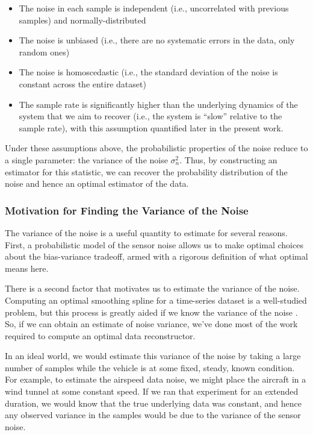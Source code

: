 \begin{itemize}
    \item The noise in each sample is independent (i.e., uncorrelated with previous samples) and normally-distributed
    \item The noise is unbiased (i.e., there are no systematic errors in the data, only random ones)
    \item The noise is homoscedastic (i.e., the standard deviation of the noise is constant across the entire dataset)
    \item The sample rate is significantly higher than the underlying dynamics of the system that we aim to recover (i.e., the system is ``slow'' relative to the sample rate), with this assumption quantified later in the present work.
\end{itemize}

Under these assumptions above, the probabilistic properties of the noise reduce to a single parameter: the variance of the noise $\sigma^2_n$. Thus, by constructing an estimator for this statistic, we can recover the probability distribution of the noise and hence an optimal estimator of the data.

\subsubsection{Motivation for Finding the Variance of the Noise}

The variance of the noise is a useful quantity to estimate for several reasons. First, a probabilistic model of the sensor noise allows us to make optimal choices about the bias-variance tradeoff, armed with a rigorous definition of what optimal means here.

There is a second factor that motivates us to estimate the variance of the noise. Computing an optimal smoothing spline for a time-series dataset is a well-studied problem, but this process is greatly aided if we know the variance of the noise \cite{wahba}. So, if we can obtain an estimate of noise variance, we've done most of the work required to compute an optimal data reconstructor.

In an ideal world, we would estimate this variance of the noise by taking a large number of samples while the vehicle is at some fixed, steady, known condition. For example, to estimate the airspeed data noise, we might place the aircraft in a wind tunnel at some constant speed. If we ran that experiment for an extended duration, we would know that the true underlying data was constant, and hence any observed variance in the samples would be due to the variance of the sensor noise.

